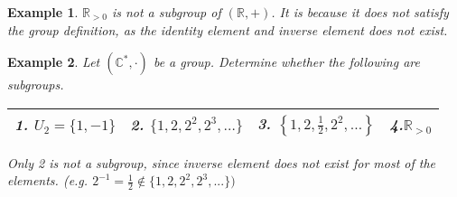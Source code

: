 \documentclass{article}
\theoremstyle{MyNonumberplain}
\theoremstyle{break}
\theoremstyle{break}
\newtheorem{example}{Example}[section]
\theoremstyle{break}
\theoremstyle{definition}
\theoremstyle{break}
\begin{document}
\begin{expbox}
    \begin{example}
        $\mathbb{R}_{> 0}$ is not a subgroup of $(\mathbb{R}, +)$. It is because
        it does not satisfy the group definition, as the identity element and inverse
        element does not exist.
    \end{example}
\end{expbox}

\begin{expbox}
    \begin{example}
        Let $(\mathbb{C}^{\ast}, \cdot)$ be a group. Determine whether the following are subgroups.

            {\noindent}\begin{tabularx}{1.0\textwidth}{|@{}X@{}|@{}X@{}|@{}X@{}|@{}X@{}|}
            \hline
            1. $U_2 = \{ 1, - 1 \}$ & 2. $\{ 1, 2, 2^2, 2^3, \ldots \}$ & 3. $\left\{ 1, 2,
            \frac{1}{2}, 2^2, \ldots \right\}$ & 4.$\mathbb{R}_{> 0}$\\
            
            \hline

            \end{tabularx}

            \begin{ansbox}
                Only 2 is not a subgroup, since inverse element does not exist for most of the elements.\bigskip
                (e.g. $2^{-1}=\frac{1}{2}\not\in \{1,2,2^2,2^3,...\})$
        
            \end{ansbox}
    \end{example}
\end{expbox}
\end{document}
